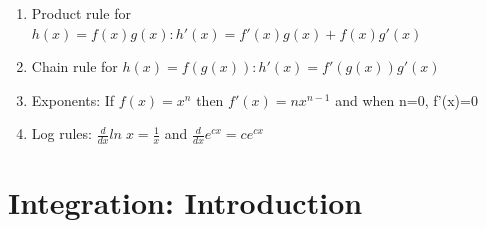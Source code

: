 \documentclass[11pt]{article}
\theoremstyle{definition}
\theoremstyle{remark}
\begin{document}
\begin{itemize}
\begin{enumerate}
\item Product rule for $h(x)=f(x)g(x):  h'(x)=f'(x)g(x) + f(x)g'(x)$\\
\item Chain rule for $h(x)=f(g(x)): h'(x)=f'(g(x))g'(x)$\\
\item Exponents: If $f(x)=x^n$ then $f'(x)=nx^{n-1}$ and when n=0, f'(x)=0\\
\item Log rules: $\frac{d}{dx} ln\;x = \frac{1}{x}$ and $\frac{d}{dx}e^{cx}=ce^{cx}$
\\
\end{enumerate}
\end{itemize}

\section{Integration: Introduction}
\end{document}
